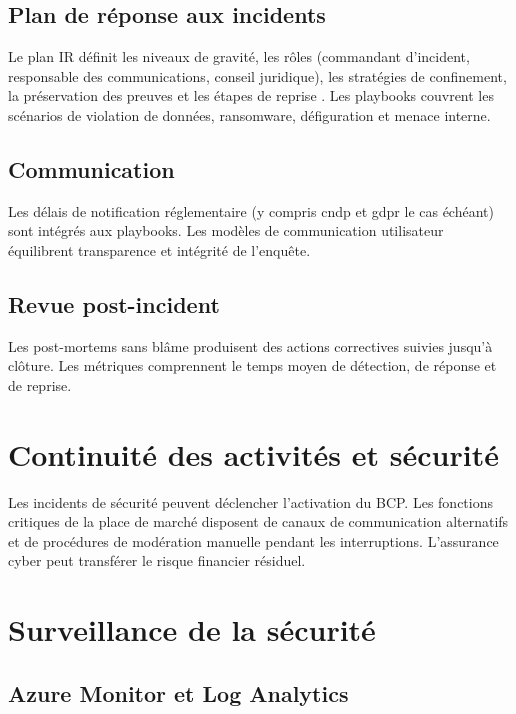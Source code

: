 \subsection{Plan de réponse aux incidents}

Le plan IR définit les niveaux de gravité, les rôles (commandant d'incident, responsable des communications, conseil juridique), les stratégies de confinement, la préservation des preuves et les étapes de reprise \parencite{nist80061}. Les playbooks couvrent les scénarios de violation de données, ransomware, défiguration et menace interne.

\subsection{Communication}

Les délais de notification réglementaire (y compris \gls{cndp} et \gls{gdpr} le cas échéant) sont intégrés aux playbooks. Les modèles de communication utilisateur équilibrent transparence et intégrité de l'enquête.

\subsection{Revue post-incident}

Les post-mortems sans blâme produisent des actions correctives suivies jusqu'à clôture. Les métriques comprennent le temps moyen de détection, de réponse et de reprise.

\section{Continuité des activités et sécurité}

Les incidents de sécurité peuvent déclencher l'activation du BCP. Les fonctions critiques de la place de marché disposent de canaux de communication alternatifs et de procédures de modération manuelle pendant les interruptions. L'assurance cyber peut transférer le risque financier résiduel.

\section{Surveillance de la sécurité}

\subsection{Azure Monitor et Log Analytics}

